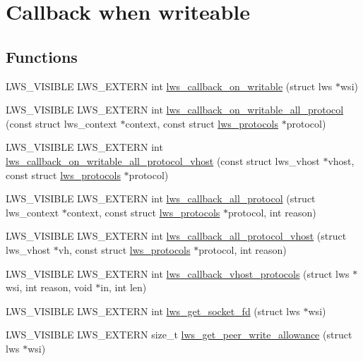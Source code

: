 \hypertarget{group__callback-when-writeable}{}\section{Callback when writeable}
\label{group__callback-when-writeable}
\subsection*{Functions}
\begin{DoxyCompactItemize}
\item 
L\+W\+S\+\_\+\+V\+I\+S\+I\+B\+LE L\+W\+S\+\_\+\+E\+X\+T\+E\+RN int \hyperlink{group__callback-when-writeable_ga941caaa468bc507b1cae52275f58800d}{lws\+\_\+callback\+\_\+on\+\_\+writable} (struct lws $\ast$wsi)
\item 
L\+W\+S\+\_\+\+V\+I\+S\+I\+B\+LE L\+W\+S\+\_\+\+E\+X\+T\+E\+RN int \hyperlink{group__callback-when-writeable_gabbe4655c7eeb3eb1671b2323ec6b3107}{lws\+\_\+callback\+\_\+on\+\_\+writable\+\_\+all\+\_\+protocol} (const struct lws\+\_\+context $\ast$context, const struct \hyperlink{structlws__protocols}{lws\+\_\+protocols} $\ast$protocol)
\item 
L\+W\+S\+\_\+\+V\+I\+S\+I\+B\+LE L\+W\+S\+\_\+\+E\+X\+T\+E\+RN int \hyperlink{group__callback-when-writeable_ga8570860e191b62db264f2bac67354ea8}{lws\+\_\+callback\+\_\+on\+\_\+writable\+\_\+all\+\_\+protocol\+\_\+vhost} (const struct lws\+\_\+vhost $\ast$vhost, const struct \hyperlink{structlws__protocols}{lws\+\_\+protocols} $\ast$protocol)
\item 
L\+W\+S\+\_\+\+V\+I\+S\+I\+B\+LE L\+W\+S\+\_\+\+E\+X\+T\+E\+RN int \hyperlink{group__callback-when-writeable_gacf04bbe089f47c971c6408c5efe2ac70}{lws\+\_\+callback\+\_\+all\+\_\+protocol} (struct lws\+\_\+context $\ast$context, const struct \hyperlink{structlws__protocols}{lws\+\_\+protocols} $\ast$protocol, int reason)
\item 
L\+W\+S\+\_\+\+V\+I\+S\+I\+B\+LE L\+W\+S\+\_\+\+E\+X\+T\+E\+RN int \hyperlink{group__callback-when-writeable_ga13c984d8c5a44a745fd02bc2fba36053}{lws\+\_\+callback\+\_\+all\+\_\+protocol\+\_\+vhost} (struct lws\+\_\+vhost $\ast$vh, const struct \hyperlink{structlws__protocols}{lws\+\_\+protocols} $\ast$protocol, int reason)
\item 
L\+W\+S\+\_\+\+V\+I\+S\+I\+B\+LE L\+W\+S\+\_\+\+E\+X\+T\+E\+RN int \hyperlink{group__callback-when-writeable_ga60939cf0c073d933fde3d17f3591caf5}{lws\+\_\+callback\+\_\+vhost\+\_\+protocols} (struct lws $\ast$wsi, int reason, void $\ast$in, int len)
\item 
L\+W\+S\+\_\+\+V\+I\+S\+I\+B\+LE L\+W\+S\+\_\+\+E\+X\+T\+E\+RN int \hyperlink{group__callback-when-writeable_gaa709e02a10558753c851e58f1e2c16ba}{lws\+\_\+get\+\_\+socket\+\_\+fd} (struct lws $\ast$wsi)
\item 
L\+W\+S\+\_\+\+V\+I\+S\+I\+B\+LE L\+W\+S\+\_\+\+E\+X\+T\+E\+RN size\+\_\+t \hyperlink{group__callback-when-writeable_gac4643fe16b0940ae5b68b4ee6195cbde}{lws\+\_\+get\+\_\+peer\+\_\+write\+\_\+allowance} (struct lws $\ast$wsi)
\end{DoxyCompactItemize}



